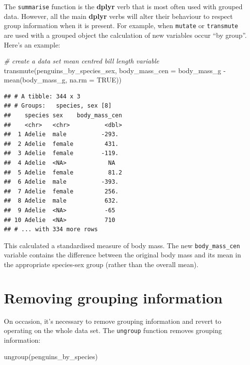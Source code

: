 \documentclass[
]{book}
\newenvironment{Shaded}{\begin{snugshade}}{\end{snugshade}}
\newcommand{\AttributeTok}[1]{\textcolor[rgb]{0.77,0.63,0.00}{#1}}
\newcommand{\CommentTok}[1]{\textcolor[rgb]{0.56,0.35,0.01}{\textit{#1}}}
\newcommand{\ConstantTok}[1]{\textcolor[rgb]{0.00,0.00,0.00}{#1}}
\newcommand{\FunctionTok}[1]{\textcolor[rgb]{0.00,0.00,0.00}{#1}}
\newcommand{\NormalTok}[1]{#1}
\newcommand{\SpecialCharTok}[1]{\textcolor[rgb]{0.00,0.00,0.00}{#1}}
\begin{document}
The \texttt{summarise} function is the \textbf{dplyr} verb that is most often used with grouped data. However, all the main \textbf{dplyr} verbs will alter their behaviour to respect group information when it is present. For example, when \texttt{mutate} or \texttt{transmute} are used with a grouped object the calculation of new variables occur ``by group''. Here's an example:

\begin{Shaded}
\begin{Highlighting}[]
\CommentTok{\# create a data set \textquotesingle{}mean centred\textquotesingle{} bill length variable}
\FunctionTok{transmute}\NormalTok{(penguins\_by\_species\_sex,}
          \AttributeTok{body\_mass\_cen =}\NormalTok{ body\_mass\_g }\SpecialCharTok{{-}} \FunctionTok{mean}\NormalTok{(body\_mass\_g, }\AttributeTok{na.rm =} \ConstantTok{TRUE}\NormalTok{))}
\end{Highlighting}
\end{Shaded}

\begin{verbatim}
## # A tibble: 344 x 3
## # Groups:   species, sex [8]
##    species sex    body_mass_cen
##    <chr>   <chr>          <dbl>
##  1 Adelie  male          -293. 
##  2 Adelie  female         431. 
##  3 Adelie  female        -119. 
##  4 Adelie  <NA>            NA  
##  5 Adelie  female          81.2
##  6 Adelie  male          -393. 
##  7 Adelie  female         256. 
##  8 Adelie  male           632. 
##  9 Adelie  <NA>           -65  
## 10 Adelie  <NA>           710  
## # ... with 334 more rows
\end{verbatim}

This calculated a standardised measure of body mass. The new \texttt{body\_mass\_cen} variable contains the difference between the original body mass and its mean in the appropriate species-sex group (rather than the overall mean).

\hypertarget{removing-grouping-information}{%
\section{Removing grouping information}\label{removing-grouping-information}}

On occasion, it's necessary to remove grouping information and revert to operating on the whole data set. The \texttt{ungroup} function removes grouping information:

\begin{Shaded}
\begin{Highlighting}[]
\FunctionTok{ungroup}\NormalTok{(penguins\_by\_species)}
\end{Highlighting}
\end{Shaded}
\end{document}

